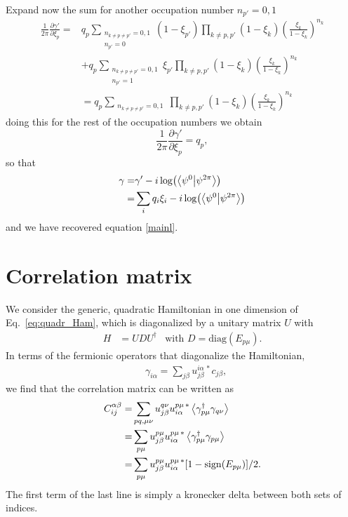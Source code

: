 \documentclass[twocolumn,amsmath,longbibliography,amssymb,superscriptaddress]{revtex4-1}
\begin{document}
Expand now the sum  for another occupation number $n_{p'} = 0,1$ 
\begin{align*}
\frac{1}{2\pi}\frac{\partial \gamma'}{\partial \xi_p} =& q_p\sum_{\substack{n_{k \neq p \neq p'}=0,1\\ n_{p'}= 0}} (1-\xi_{p'})\prod_{k\neq p,p'} (1-\xi_k)\left( \frac{\xi_k}{1-\xi_k} \right)^{n_k} \\
&+ q_p\sum_{\substack{n_{k \neq p \neq p'}=0,1\\ n_{p'}= 1}} \xi_{p'}\prod_{k\neq p,p'} (1-\xi_k)\left( \frac{\xi_k}{1-\xi_k} \right)^{n_k} \\
 &=q_p\sum_{\substack{n_{k \neq p \neq p'}=0,1}} \prod_{k\neq p,p'} (1-\xi_k)\left( \frac{\xi_k}{1-\xi_k} \right)^{n_k} 
\end{align*}
doing this for the rest of the occupation numbers we obtain 
\begin{equation}
\frac{1}{2\pi}\frac{\partial \gamma'}{\partial \xi_p} = q_p,
\end{equation}
so that 
\begin{align*}
\gamma =& \gamma' - i\log(\bra{\psi^0}\ket{\psi^{2\pi}})\\
=& \sum_{i}q_i \xi_i - i\log(\bra{\psi^0}\ket{\psi^{2\pi}})\\
\end{align*}
and we have recovered equation \ref{mainl}. 

\section{Correlation matrix}\label{app:CM}
We consider the generic, quadratic Hamiltonian in one dimension of Eq.~\ref{eq:quadr_Ham}, which is diagonalized by a unitary matrix $U$ with 
	\begin{align}\label{eq:D}
	H&=UDU^\dagger& \mbox{with } D=\mbox{diag}(E_{p\mu}).
	\end{align} 
In terms of the fermionic operators that diagonalize the Hamiltonian, 
\begin{align}
& \gamma_{i\alpha} = \sum_{j\beta}u_{j\beta}^{i\alpha \, \ast} c_{j\beta},
\end{align}
we find that the correlation matrix can be written as 
\begin{align}\label{eq:corr_mat}
C_{ij}^{\alpha \beta} =& \sum_{pq,\mu\nu} u^{q\nu }_{j\beta} u^{p\mu \, \ast}_{i\alpha} \expval{\gamma^\dagger_{p\mu} \gamma_{q\nu} }\nonumber \\
=&  \sum_{p\mu} u^{p\mu }_{j\beta} u^{p\mu \, \ast}_{i\alpha} \expval{\gamma^\dagger_{p\mu} \gamma_{p\mu} }\nonumber \\
=&  \sum_{p\mu} u^{p\mu }_{j\beta} u^{p\mu \, \ast}_{i\alpha} [1-{\rm sign}(E_{p\mu})]/2.
\end{align}
The first term of the last line is simply a kronecker delta between both sets of indices. 
\end{document}
